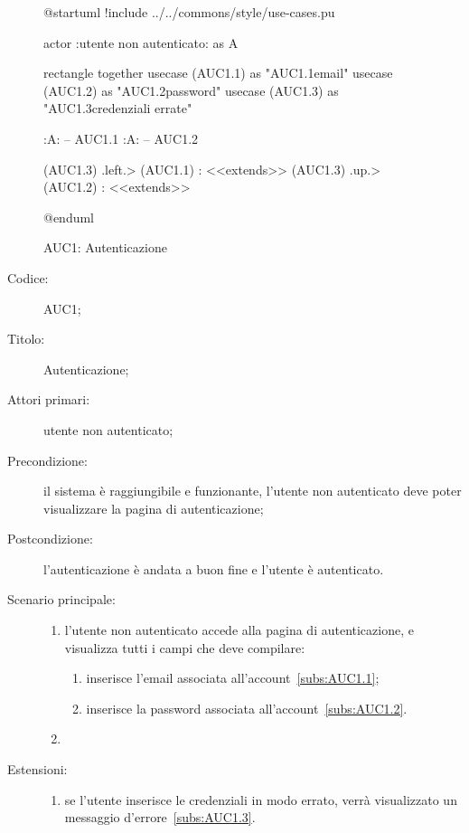 \documentclass[../../../analisi-dei-requisiti.tex]{subfiles}
\begin{document}
\begin{figure}[H]
  \centering
  \begin{plantuml}
  @startuml
  !include ../../commons/style/use-cases.pu

  actor :utente non autenticato: as A

  rectangle {
    together {
    usecase (AUC1.1) as "AUC1.1\nInserimento email"
    usecase (AUC1.2) as "AUC1.2\nInserimento password"
    }
    usecase (AUC1.3) as "AUC1.3\nVisualizzazione credenziali errate"
  }

  :A: -- AUC1.1
  :A: -- AUC1.2

  (AUC1.3) .left.> (AUC1.1) : <<extends>>
  (AUC1.3) .up.> (AUC1.2) : <<extends>>

  @enduml
  \end{plantuml}
  \caption{AUC1: Autenticazione}%
  \label{fig:auc1}
\end{figure}

\begin{description}
  \item[Codice:] AUC1;
  \item[Titolo:] Autenticazione;
  \item[Attori primari:] utente non autenticato;
  \item[Precondizione:] il sistema è raggiungibile e funzionante, l'utente non autenticato deve poter visualizzare la pagina di autenticazione;
  \item[Postcondizione:] l'autenticazione è andata a buon fine e l'utente è autenticato.
  \item[Scenario principale:]
  \begin{enumerate}
    \item l'utente non autenticato accede alla pagina di autenticazione, e visualizza tutti i campi che deve compilare:
    \begin{enumerate}
      \item inserisce l’email associata all’account~\ref{subs:AUC1.1};
      \item inserisce la password associata all’account~\ref{subs:AUC1.2}.
    \end{enumerate}
    \item
  \end{enumerate}
  \item[Estensioni:]
  \begin{enumerate}
    \item se l'utente inserisce le credenziali in modo errato, verrà visualizzato un messaggio d'errore~\ref{subs:AUC1.3}.
  \end{enumerate}
\end{description}
\end{document}
